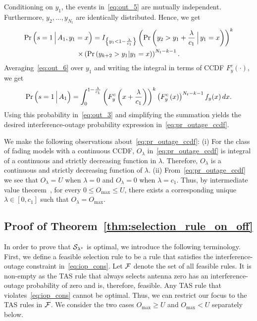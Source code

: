 \documentclass[12pt,draftcls,peerreview,onecolumn]{IEEEtran}
\newcommand{\brac}[1]{\left({#1}\right)}
\newcommand{\cbrac}[1]{\left\{{#1}\right\}}
\newcommand{\indic}[1]{I_{\cbrac{#1}}}
\newcommand{\given}{\arrowvert}
\newcommand{\Given}{\Big\arrowvert}
\newcommand{\setAgt}{A_1}
\newcommand{\lam}{\lambda}
\newcommand{\F}{\cal{F}}
\newcommand{\Nt}{{N_t}}
\newcommand{\outmax}{O_{\text{max}}}
\newcommand{\cone}{c_{1}}
\newcommand{\out}{O}
\newcommand{\m}{\cone}
\newcommand{\lambym}{\frac{\lam}{\m}}
\newcommand{\yk}[1]{y_{#1}}
\newcommand{\un}{U}
\newcommand{\outlam}{\out_{\lam}}
\newcommand{\callamstarrule}{\cal S_{\lam^{*}}}
\newcommand{\ccdfy}[1]{F^{c}_{y}\left(#1 \right)}
\begin{document}
Conditioning on $\yk{1}$, the events in~\eqref{eq:out_5} are mutually independent. Furthermore, $\yk{2},\ldots,\yk{\Nt} $ are identically distributed. Hence, we get
%
\begin{multline}
\text{Pr}\brac{s=1\Given \setAgt, \yk{1}=x} = \indic{\yk{1}<1-\lambym}\left(\text{Pr}\brac{\yk{2}>\yk{1}+\lambym\Given\yk{1}=x}\right)^{k}\\\times \left(\text{Pr}\brac{\yk{k+2}>\yk{1}\given\yk{1}=x}\right)^{\Nt-k-1}.
\label{eq:out_6}
\end{multline}
%
Averaging~\eqref{eq:out_6} over $\yk{1}$ and writing the integral in terms of CCDF $\ccdfy{\cdot}$, we get 
\begin{equation}
\text{Pr}\brac{s=1\Given\setAgt} =\int_{0}^{1-\lambym}\left(F_{y}^{c}\left(x+\lambym\right)\right)^k \left(F_{y}^{c}\left(x\right)\right)^{\Nt-k-1}f_{y}(x)\,dx.
\label{eq:out_7}
\end{equation}
Using this probability in~\eqref{eq:out_3}  and simplifying the summation yields the desired interference-outage probability expression in~\eqref{eq:pr_outage_ccdf}.

We make the following observations about~\eqref{eq:pr_outage_ccdf}: (i) For the class of fading models with a continuous CCDF, $\outlam$ in~\eqref{eq:pr_outage_ccdf} is integral of a continuous and strictly decreasing  function in $\lam$.  Therefore, $\outlam$ is a continuous and strictly decreasing function of $\lam$. (ii) From~\eqref{eq:pr_outage_ccdf}  we see that $\outlam=\un$ when $\lam=0$ and $\outlam=0$ when $\lam=\cone$. Thus, by intermediate value theorem~\cite{Rudin_book}, for every $0\leq\outmax\leq\un$,  there exists a corresponding unique $\lam\in[0,\m]$ such that $\outlam=\outmax$. 
  

		

\subsection{Proof of Theorem~\ref{thm:selection_rule_on_off}}
\label{proof:selection_rule_on_off}
In order to prove that $\callamstarrule$ is optimal, we introduce the following terminology. First, we define a feasible selection rule to be a rule that satisfies the interference-outage constraint in~\eqref{eq:iop_cons}. Let $\F$ denote the set of all feasible rules. It is non-empty as the TAS rule that always selects antenna zero has an interference-outage probability of zero and is, therefore, feasible. Any TAS rule that violates~\eqref{eq:iop_cons} cannot be optimal. Thus, we can restrict our focus to the TAS rules in $\F$. We consider the two cases $\outmax\geq\un$ and $\outmax<\un$ separately below.
\end{document}
